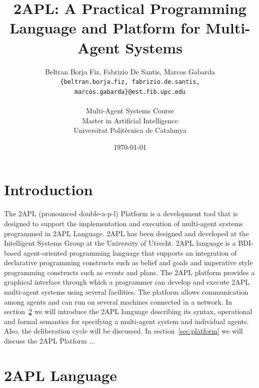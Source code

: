 \documentclass[a4paper]{article}
\begin{document}
\title{2APL: A Practical Programming Language and Platform for Multi-Agent Systems}
 
\author{Beltran Borja Fiz, Fabrizio De Santis, Marcos Gabarda\\
\small \texttt{\{beltran.borja.fiz, fabrizio.de.santis, marcos.gabarda\}@est.fib.upc.edu}\\
\\
Multi-Agent Systems Course\\
Master in Artificial Intelligence\\
Universitat Polit\`ecnica de Catalunya}
\date{\today}

\newenvironment{fminipage}%
  {\begin{Sbox}\begin{minipage}}%
  {\end{minipage}\end{Sbox}\fbox{\TheSbox}}


\maketitle

\tableofcontents

\section{Introduction} %

The 2APL (pronounced double-a-p-l) Platform is a development tool that is designed to support the implementation and execution of multi-agent systems programmed in 2APL Language. 2APL has been designed and developed at the Intelligent Systems Group at the University of Utrecht. 2APL language is a BDI-based agent-oriented programming language that supports an integration of declarative programming constructs such as belief and goals and imperative style programming constructs such as events and plans. The 2APL platform
provides a graphical interface through which a programmer can develop and execute 2APL multi-agent systems using several facilities. The platform allows communication among agents and can run on several machines connected in a network.
In section~\ref{sec:lang} we will introduce the 2APL language describing its syntax, operational and formal semantics for specifying a multi-agent system and individual agents. Also, the deliberation cycle will be discussed. In section~\ref{sec:platform} we will discuss the 2APL Platform ...


\section{2APL Language}\label{sec:lang} %
\end{document}
